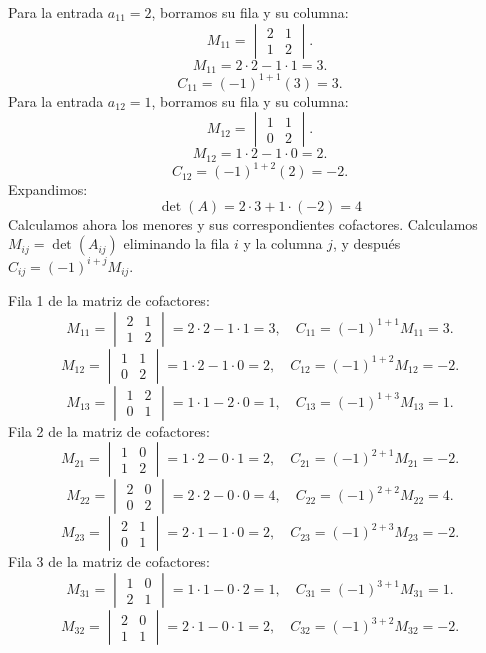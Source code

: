 \documentclass[12pt]{article}
\theoremstyle{remark}
\begin{document}
Para la entrada $a_{11}=2$, borramos su fila y su columna:
\[
M_{11}=\begin{vmatrix}2&1\\1&2\end{vmatrix}.
\]
\[
M_{11}=2\cdot 2-1\cdot 1=3.
\]
\[
C_{11}=(-1)^{1+1}(3)=3.
\]
Para la entrada $a_{12}=1$, borramos su fila y su columna:
\[
M_{12}=\begin{vmatrix}1&1\\0&2\end{vmatrix}.
\]
\[
M_{12}=1\cdot 2-1\cdot 0=2.
\]
\[
C_{12}=(-1)^{1+2}(2)=-2.
\]
Expandimos: \[
\boxed{\det(A)=2\cdot 3 + 1\cdot (-2)=4}
\]
Calculamos ahora los menores y sus correspondientes cofactores. Calculamos $M_{ij}=\det(A_{ij})$ eliminando la fila $i$ y la columna $j$, y después $C_{ij}=(-1)^{i+j}M_{ij}$.

Fila 1 de la matriz de cofactores:
\[
M_{11}=\begin{vmatrix}2&1\\1&2\end{vmatrix}=2\cdot 2-1\cdot 1=3,\quad C_{11}=(-1)^{1+1}M_{11}=3.
\]
\[
M_{12}=\begin{vmatrix}1&1\\0&2\end{vmatrix}=1\cdot 2-1\cdot 0=2,\quad C_{12}=(-1)^{1+2}M_{12}=-2.
\]
\[
M_{13}=\begin{vmatrix}1&2\\0&1\end{vmatrix}=1\cdot 1-2\cdot 0=1,\quad C_{13}=(-1)^{1+3}M_{13}=1.
\]
Fila 2 de la matriz de cofactores:
\[
M_{21}=\begin{vmatrix}1&0\\1&2\end{vmatrix}=1\cdot 2-0\cdot 1=2,\quad C_{21}=(-1)^{2+1}M_{21}=-2.
\]
\[
M_{22}=\begin{vmatrix}2&0\\0&2\end{vmatrix}=2\cdot 2-0\cdot 0=4,\quad C_{22}=(-1)^{2+2}M_{22}=4.
\]
\[
M_{23}=\begin{vmatrix}2&1\\0&1\end{vmatrix}=2\cdot 1-1\cdot 0=2,\quad C_{23}=(-1)^{2+3}M_{23}=-2.
\]
Fila 3 de la matriz de cofactores:
\[
M_{31}=\begin{vmatrix}1&0\\2&1\end{vmatrix}=1\cdot 1-0\cdot 2=1,\quad C_{31}=(-1)^{3+1}M_{31}=1.
\]
\[
M_{32}=\begin{vmatrix}2&0\\1&1\end{vmatrix}=2\cdot 1-0\cdot 1=2,\quad C_{32}=(-1)^{3+2}M_{32}=-2.
\]
\end{document}
